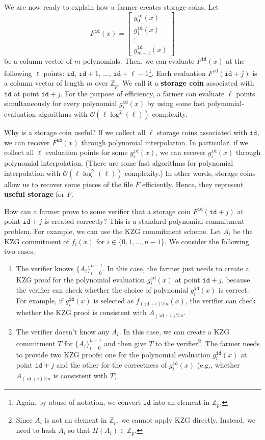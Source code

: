 \documentclass[12pt,draftcls,onecolumn]{IEEEtran}
\newcommand{\Fp}{\mathbb{Z}_p}
\newcommand{\id}{\texttt{id}}
\begin{document}
We are now ready to explain how a farmer creates storage coins. Let
\[
F^{\id}(x) = \begin{bmatrix} g_0^{\id}(x)\\ g_1^{\id}(x)\\  \vdots \\ g_{m-1}^{\id}(x) \end{bmatrix}
\]
be a column vector of $m$ polynomials. 
Then, we can evaluate $F^{\id}(x)$ at the following $\ell$ points: $\id$, $\id + 1$, $\ldots$, $\id + \ell - 1$\footnote{Again, by abuse of notation, we convert $\id$ into an element in $\Fp$.}.
Each evaluation $F^{\id}(\id + j)$ is a column vector of length $m$ over $\Fp$. We  call it a {\bf storage coin}
associated with $\id$ at point $\id + j$.
For the purpose of efficiency, a farmer can evaluate $\ell$ points simultaneously for every polynomial $g_i^{\id}(x)$
by using some fast polynomial-evaluation algorithms with $\mathcal{O}(\ell \log^2(\ell))$ complexity.


Why is a storage coin useful? If we collect all $\ell$ storage coins associated with $\id$, we can recover $F^{\id}(x)$ through polynomial interpolation.
In particular, if we collect all $\ell$ evaluation points for some $g_i^{\id}(x)$, we can recover $g_i^{\id}(x)$ through polynomial interpolation.
(There are some fast algorithms for polynomial interpolation with $\mathcal{O}(\ell \log^2(\ell))$ complexity.)
In other words, storage coins allow us to recover some pieces of the file $F$ efficiently. Hence, they represent {\bf useful storage} for $F$.

How can a farmer prove to some verifier that a storage coin $F^{\id}(\id + j)$ at point $\id + j$ is created correctly? This is a standard polynomial commitment problem. For example, we can use the
KZG commitment scheme. Let $A_i$ be the KZG commitment of $f_i(x)$ for $i \in \{0, 1, \ldots, n-1\}$. 
We consider the following two cases.
\begin{enumerate}
    \item The verifier knows $\{ A_i \}_{i = 0}^{n - 1}$. In this case, the farmer just needs to create a KZG proof for the polynomial evaluation $g_i^{\id}(x)$ at point $\id + j$, because the verifier can check whether the choice of polynomial $g_i^{\id}(x)$ is correct. For example, if $g_i^{\id}(x)$ is selected as $f_{(\id + i)\% n}(x)$, the verifier can check whether the KZG proof is consistent with $A_{(\id + i)\% n}$. 
    \item The verifier doesn't know any $A_i$. In this case, we can create a KZG commitment $T$ for $\{ A_i \}_{i = 0}^{n - 1}$ and then give $T$ to the verifier\footnote{Since $A_i$ is not an element in $\Fp$, we cannot apply KZG directly. Instead, we need to hash $A_i$ so that $H(A_i) \in \Fp$.}.  The farmer needs to provide two KZG proofs: one for the polynomial evaluation $g_i^{\id}(x)$ at point $\id + j$ and the other for the correctness of $g_i^{\id}(x)$ (e.g., whether $A_{(\id + i)\% n}$ is consistent with $T$).
\end{enumerate}
\end{document}
